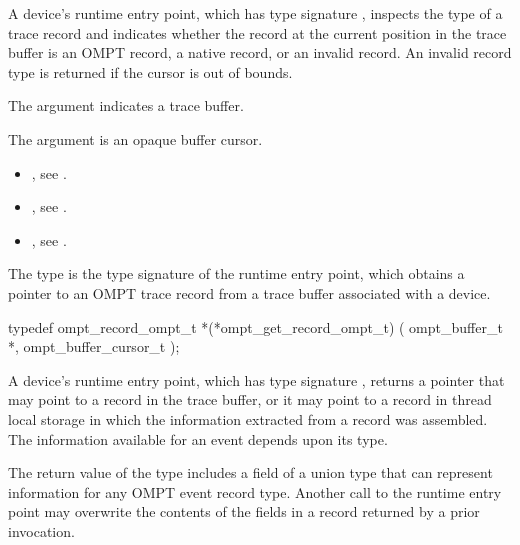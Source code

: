 A device's  runtime entry point, which has
type signature , inspects the type of a 
trace record and indicates whether the record at the current position 
in the trace buffer is an OMPT record, a native record, or an invalid 
record. An invalid record type is returned if the cursor is out of bounds.

\argdesc
The  argument indicates a trace buffer.

The  argument is an opaque buffer cursor.

\crossreferences
\begin{itemize}
\item {}, see .

\item {}, see .

\item {}, see .
\end{itemize}



\label{sec:ompt_get_record_ompt_t}

\summary
The  type is the type signature of the 
 runtime entry point, which obtains a pointer 
to an OMPT trace record from a trace buffer associated with a device.

\format
\begin{ccppspecific}
\begin{omptInquiry}
typedef ompt_record_ompt_t *(*ompt_get_record_ompt_t) (
  ompt_buffer_t *,
  ompt_buffer_cursor_t 
);
\end{omptInquiry}
\end{ccppspecific}

\descr
A device's  runtime entry point, which has
type signature , returns a pointer that may 
point to a record in the trace buffer, or it may point to a record in 
thread local storage in which the information extracted from a record was 
assembled. The information available for an event depends upon its type.

The return value of the  type includes a field 
of a union type that can represent information for any OMPT event record 
type. Another call to the runtime entry point may overwrite the contents 
of the fields in a record returned by a prior invocation.

